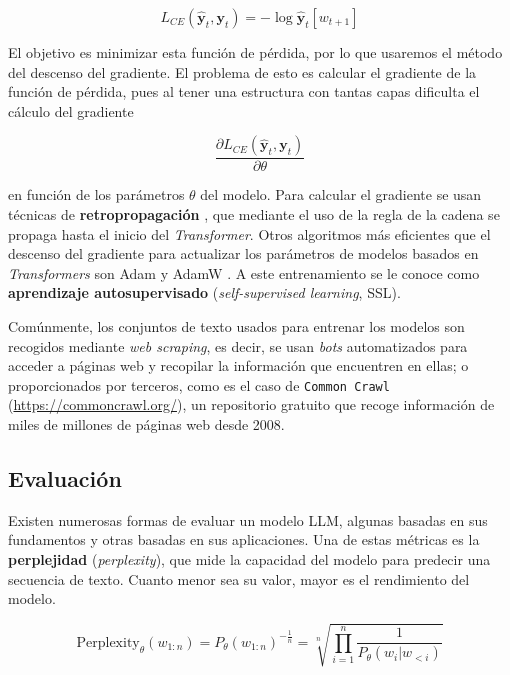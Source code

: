 \documentclass[12pt,twoside]{article}
\begin{document}
\begin{equation}
    L_{CE}(\hat{\mathbf{y}}_{t},\mathbf{y}_{t})=-\log\hat{\mathbf{y}}_{t}[w_{t+1}]
\end{equation}

El objetivo es minimizar esta función de pérdida, por lo que usaremos el método del descenso del gradiente. El problema de esto es calcular el gradiente de la función de pérdida, pues al tener una estructura con tantas capas dificulta el cálculo del gradiente

\begin{equation}
    \frac{\partial L_{CE}(\hat{\mathbf{y}}_{t},\mathbf{y}_{t})}{\partial \theta}
\end{equation}

en función de los parámetros $\theta$ del modelo. Para calcular el gradiente se usan técnicas de \textbf{retropropagación} \cite{retropropagación}, que mediante el uso de la regla de la cadena se propaga hasta el inicio del \textit{Transformer}. Otros algoritmos más eficientes que el descenso del gradiente para actualizar los parámetros de modelos basados en \textit{Transformers} son Adam \cite{Adam} y AdamW \cite{AdamW}. A este entrenamiento se le conoce como \textbf{aprendizaje autosupervisado} (\textit{self-supervised learning}, SSL).

Comúnmente, los conjuntos de texto usados para entrenar los modelos son recogidos mediante \textit{web scraping}, es decir, se usan \textit{bots} automatizados para acceder a páginas web y recopilar la información que encuentren en ellas; o proporcionados por terceros, como es el caso de \texttt{Common Crawl} (\url{https://commoncrawl.org/}), un repositorio gratuito que recoge información de miles de millones de páginas web desde 2008.

\subsection{Evaluación}
Existen numerosas formas de evaluar un modelo LLM, algunas basadas en sus fundamentos y otras basadas en sus aplicaciones. Una de estas métricas es la \textbf{perplejidad} (\textit{perplexity}), que mide la capacidad del modelo para predecir una secuencia de texto. Cuanto menor sea su valor, mayor es el rendimiento del modelo.

\begin{equation}
    \text{Perplexity}_\theta(w_{1:n})=P_\theta(w_{1:n})^{-\frac{1}{n}}=\sqrt[n]{\prod_{i=1}^n\frac{1}{P_\theta(w_{i}|w_{<i})}}
\end{equation}
\end{document}
